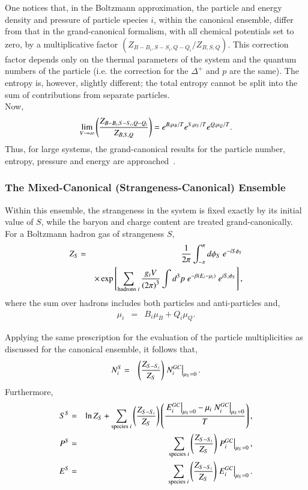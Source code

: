 \documentclass{elsarticle}
\begin{document}
One notices that, in the Boltzmann approximation, the
particle and energy density and pressure of particle species $i$, within the
canonical ensemble, differ from that in the grand-canonical formalism, with all chemical 
potentials set to zero, by a multiplicative factor $\left({Z_{B-B_i,S-S_i,Q-Q_i}/Z_{B,S,Q}}\right)$. 
This correction factor depends only on the thermal parameters of the 
system and the quantum numbers of the particle (i.e. the correction for the 
$\Delta^+$ and $p$ are the same). The
entropy is, however, slightly different; the total entropy cannot be
split into the sum of contributions from separate particles.\\

Now, 
\begin{eqnarray}
  \lim_{V\rightarrow\infty}\left({Z_{B-B_i,S-S_i,Q-Q_i}\over
    Z_{B,S,Q}}\right) = e^{B_i\mu_B/T}e^{S_i\mu_S/T}e^{Q_i\mu_Q/T}.\label{Eq:Corr Factors}
  \end{eqnarray}
Thus, for large systems, the grand-canonical results for the particle number, entropy, 
pressure and energy are approached~\cite{Keranen:2001pr}.\\

\subsubsection{The Mixed-Canonical (Strangeness-Canonical) Ensemble}\label{SubSection::SCanonical}

Within this ensemble, the strangeness in the system is fixed exactly by its 
initial value of $S$, while the baryon and charge content are treated grand-canonically. 
For a Boltzmann hadron gas of strangeness $S$,
\begin{eqnarray}
Z_{S} &=& {1\over2\pi}\int_{-\pi}^{\pi}d\phi_S\;e^{-iS\phi_S}\nonumber\\
& & \times\exp\left[\sum_{\mathrm{hadrons}\;i}{g_iV\over\left(2\pi\right)^3}\int
d^3p\;e^{-\beta\left(
  E_i-\mu_i\right)}\;e^{iS_i\phi_S}\right],
\end{eqnarray}
where the sum over hadrons includes both particles and
anti-particles and,
\begin{eqnarray}
\mu_i &=& B_i\mu_B + Q_i\mu_Q.
\end{eqnarray}

Applying the same prescription for the evaluation of the particle multiplicities as discussed 
for the canonical ensemble, it follows that,
\begin{eqnarray}
  N_i^{S} &=& \left({Z_{S-S_i}\over
  Z_{S}}\right)\left.N_i^{GC}\right|_{\mu_S=0}.
\end{eqnarray}
Furthermore,
\begin{eqnarray}
  S^{S} &=& \ln Z_{S} + \sum_{\mathrm{species}\;i} \left({Z_{S-S_i}\over
    Z_{S}}\right)\left({\left.E_i^{GC}\right|_{\mu_S=0}-\mu_i\left.N_i^{GC}\right|_{\mu_S=0}\over T}\right),\\
  P^{S} &=&  \sum_{\mathrm{species}\;i} \left({Z_{S-S_i}\over
    Z_{S}}\right)\left.P_i^{GC}\right|_{\mu_S=0},\\
  E^{S} &=& \sum_{\mathrm{species}\;i} \left({Z_{S-S_i}\over
    Z_{S}}\right)\left.E_i^{GC}\right|_{\mu_S=0}.
\end{eqnarray}
\end{document}

